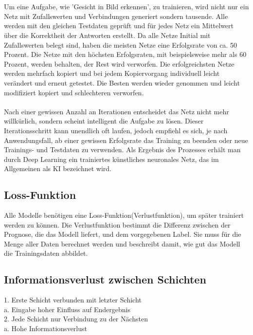 \documentclass[12pt,oneside,a4paper,parskip]{scrbook}
\begin{document}
\\\\
Um eine Aufgabe, wie 'Gesicht in Bild erkennen', zu trainieren, wird nicht nur ein Netz mit Zufallswerten und Verbindungen generiert sondern tausende. Alle werden mit den gleichen Testdaten geprüft und für jedes Netz ein Mittelwert über die Korrektheit der Antworten erstellt. Da alle Netze Initial mit Zufallswerten belegt sind, haben die meisten Netze eine Erfolgsrate von ca. 50 Prozent. Die Netze mit den höchsten Erfolgsraten, mit beispielsweise mehr als 60 Prozent, werden behalten, der Rest wird verworfen. Die erfolgreichsten Netze werden mehrfach kopiert und bei jedem Kopiervorgang individuell leicht verändert und erneut getestet. Die Besten werden wieder genommen und leicht modifiziert kopiert und schlechteren verworfen.
\\\\
Nach einer gewissen Anzahl an Iterationen entscheidet das Netz nicht mehr willkürlich, sondern scheint intelligent die Aufgabe zu lösen. Dieser Iterationsschritt kann unendlich oft laufen, jedoch empfiehl es sich, je nach Anwendungsfall, ab einer gewissen Erfolgsrate das Training zu beenden oder neue Trainings- und Testdaten zu verwenden. Als Ergebnis des Prozesses erhält man durch Deep Learning ein trainiertes künstliches neuronales Netz, das im Allgemeinen als KI bezeichnet wird.

\subsection{Loss-Funktion}
\label{section:lossFunction}

Alle Modelle benötigen eine Loss-Funktion(Verlustfunktion), um später trainiert werden zu können. Die Verlustfunktion bestimmt die Differenz zwischen der Prognose, die das Modell liefert, und dem vorgegebenen Label. Sie muss für die Menge aller Daten berechnet werden und beschreibt damit, wie gut das Modell die Trainingsdaten abbildet. 
\subsection{Informationsverlust zwischen Schichten}
1.	Erste Schicht verbunden mit letzter Schicht\\
	a.	Eingabe hoher Einfluss auf Endergebnis\\
2.	Jede Schicht nur Verbindung zu der Nächsten\\
	a.	Hohe Informationsverlust\\
\end{document}
